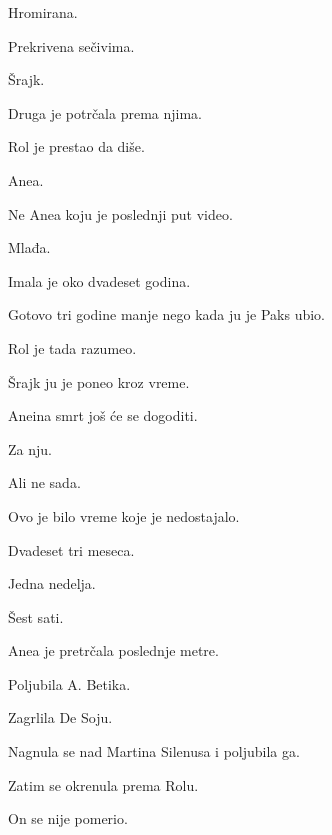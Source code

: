 Hromirana.

Prekrivena sečivima.

\bigskip

Šrajk.

\bigskip

Druga je potrčala prema njima.

\bigskip

Rol je prestao da diše.

\bigskip

Anea.

\bigskip

Ne Anea koju je poslednji put video.

\bigskip

Mlađa.

\bigskip

Imala je oko dvadeset godina.

\bigskip

Gotovo tri godine manje nego kada ju je Paks ubio.

\bigskip

Rol je tada razumeo.

\bigskip

Šrajk ju je poneo kroz vreme.

\bigskip

Aneina smrt još će se dogoditi.

\bigskip

Za nju.

\bigskip

Ali ne sada.

\bigskip

Ovo je bilo vreme koje je nedostajalo.

\bigskip

Dvadeset tri meseca.

Jedna nedelja.

Šest sati.

\bigskip

Anea je pretrčala poslednje metre.

\bigskip

Poljubila A. Betika.

Zagrlila De Soju.

Nagnula se nad Martina Silenusa i poljubila ga.

\bigskip

Zatim se okrenula prema Rolu.

\bigskip

On se nije pomerio.

\bigskip


